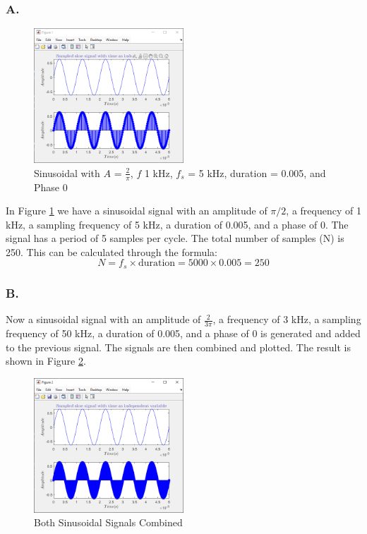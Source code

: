 \documentclass[12pt]{article}
\begin{document}
\subsubsection*{A.}
\begin{figure}[H]
	\centering
	\includegraphics[width=0.5\textwidth]{fig 3a.png}
	\caption{Sinusoidal with $A$ = $\frac{2}{\pi}$, $f$ 1 kHz, $f_s$ = 5 kHz, duration = 0.005, and Phase 0}
	\label{fig:fig7}
\end{figure}
In Figure \ref{fig:fig7} we have a sinusoidal signal with an amplitude of $\pi/2$, a frequency of 1 kHz,
a sampling frequency of 5 kHz, a duration of 0.005, and a phase of 0. The signal has
a period of 5 samples per cycle. The total number of samples (N) is 250. This can be
calculated through the formula:
\[
N = f_s \times \text{duration} = 5000 \times 0.005 = 250
\]

\subsubsection*{B.}
Now a sinusoidal signal with an amplitude of $\frac{2}{3\pi}$, a frequency of 3 kHz, 
a sampling frequency of 50 kHz, a duration of 0.005, and a phase of 0 is generated and
added to the previous signal. The signals are then combined and plotted. The result is
shown in Figure \ref{fig:fig8}.
\begin{figure}[H]
	\centering
	\includegraphics[width=0.5\textwidth]{fig 3b.png}
	\caption{Both Sinusoidal Signals Combined}
	\label{fig:fig8}
\end{figure}
\end{document}

